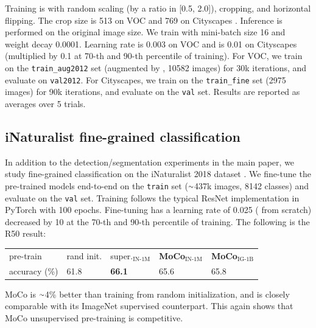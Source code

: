 \documentclass[10pt,twocolumn,letterpaper]{article}
\newcommand{\app}{\raise.17ex\hbox{$\scriptstyle\sim$}}
\newcommand{\tablestyle}[2]{\setlength{\tabcolsep}{#1}\renewcommand{\arraystretch}{#2}\centering\footnotesize}
\begin{document}
Training is with random scaling (by a ratio in [0.5, 2.0]), cropping, and horizontal flipping.
The crop size is 513 on VOC and 769 on Cityscapes \cite{Chen2017}.
Inference is performed on the original image size. We train with mini-batch size 16 and weight decay 0.0001. Learning rate is 0.003 on VOC and is 0.01 on Cityscapes (multiplied by 0.1 at 70-th and 90-th percentile of training).
For VOC, we train on the \texttt{train\_aug2012} set (augmented by \cite{Hariharan2011}, 10582 images) for 30k iterations, and evaluate on \texttt{val2012}. For Cityscapes, we train on the \texttt{train\_fine} set (2975 images) for 90k iterations, and evaluate on the \texttt{val} set. Results are reported as averages over 5 trials.

\subsection{iNaturalist fine-grained classification}
In addition to the detection/segmentation experiments in the main paper, we study fine-grained classification on the iNaturalist 2018 dataset \cite{VanHorn2018}. We fine-tune the pre-trained models end-to-end on the \texttt{train} set ($\app$437k images, 8142 classes) and evaluate on the \texttt{val} set. Training follows the typical ResNet implementation in PyTorch with 100 epochs. Fine-tuning has a learning rate of 0.025 ( from scratch) decreased by 10 at the 70-th and 90-th percentile of training.
The following is the R50 result:
\begin{center}
\vspace{-.3em}
\tablestyle{1pt}{1.2}	
\begin{tabular}{x{46}|x{45}x{45}x{45}x{45}}
pre-train & rand init. & super.$_\text{IN-1M}$ & \textbf{MoCo}$_\text{IN-1M}$ & \textbf{MoCo}$_\text{IG-1B}$  \\
\shline
accuracy (\%) & 61.8 & \textbf{66.1} & 65.6 & 65.8
\end{tabular}
\vspace{-.5em}
\end{center}
MoCo is $\app$4\% better than training from random initialization, and is closely comparable with its ImageNet supervised counterpart. This again shows that MoCo unsupervised pre-training is competitive.
\end{document}
